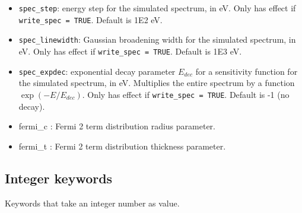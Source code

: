 \documentclass[]{article}
\begin{document}
\begin{itemize}
	\item \texttt{spec\_step}: energy step for the simulated spectrum, in eV. Only has effect if \texttt{write\_spec = TRUE}. Default is 1E2 eV.
	\item \texttt{spec\_linewidth}: Gaussian broadening width for the simulated spectrum, in eV. Only has effect if \texttt{write\_spec = TRUE}. Default is 1E3 eV.
	\item \texttt{spec\_expdec}: exponential decay parameter $E_{dec}$ for a sensitivity function for the simulated spectrum, in eV. Multiplies the entire spectrum by a function $\exp(-E/E_{dec})$. Only has effect if \texttt{write\_spec = TRUE}. Default is -1 (no decay).
        \item fermi\_c : Fermi 2 term distribution radius parameter. 
        \item fermi\_t : Fermi 2 term distribution thickness parameter. 
\end{itemize}

\subsection{Integer keywords}

Keywords that take an integer number as value.
\end{document}
